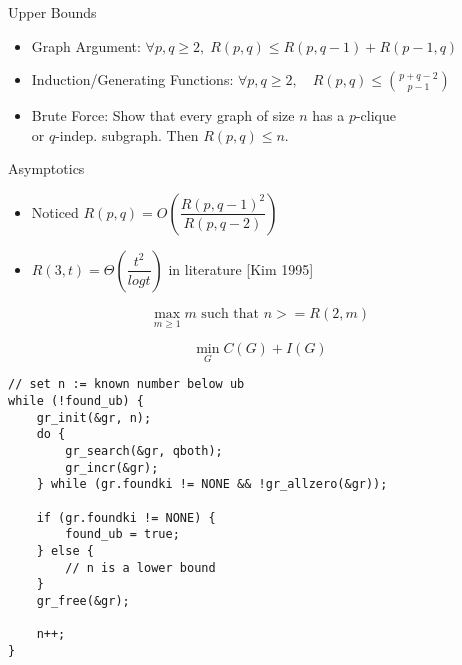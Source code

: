 \documentclass[letterpaper,12pt]{article}
\begin{document}
Upper Bounds
\begin{itemize}
\item Graph Argument: $\forall p,q \geq 2, \; R(p,q) \leq R(p,q-1) + R(p-1,q)$
\item Induction/Generating Functions: $\forall p,q \geq 2, \quad R(p,q) \leq \binom{p+q-2}{p-1}$
\item Brute Force: Show that every graph of size $n$ has a $p$-clique \\
\phantom{Brute Force:} or $q$-indep. subgraph. Then $R(p,q) \leq n$.
\end{itemize}

Asymptotics
\begin{itemize}
\item Noticed $R(p,q) = O\left(\dfrac{R(p,q-1)^2}{R(p,q-2)}\right)$
\item $R(3,t) = \Theta\left(\dfrac{t^2}{log t}\right)$ in literature [Kim 1995]
\end{itemize}

\[ 
\max_{m \geq 1} m \text{ such that } n >= R(2,m)
\]

\[
\min_G C(G) + I(G)
\]

\lstset{language=C++,tabsize=3}
\begin{lstlisting}
// set n := known number below ub
while (!found_ub) {
	gr_init(&gr, n);
	do {
		gr_search(&gr, qboth);
		gr_incr(&gr);
	} while (gr.foundki != NONE && !gr_allzero(&gr));

	if (gr.foundki != NONE) {
		found_ub = true;
	} else {
		// n is a lower bound
	}
	gr_free(&gr);

	n++;
}
\end{lstlisting}
\end{document}

